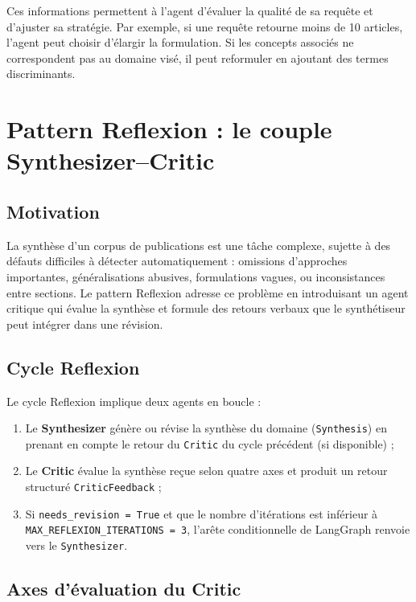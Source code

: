 Ces informations permettent à l'agent d'évaluer la qualité de sa requête
et d'ajuster sa stratégie. Par exemple, si une requête retourne moins de
10 articles, l'agent peut choisir d'élargir la formulation. Si les concepts
associés ne correspondent pas au domaine visé, il peut reformuler en
ajoutant des termes discriminants.

\section{Pattern Reflexion : le couple Synthesizer--Critic}
\label{sec:reflexion}

\subsection{Motivation}

La synthèse d'un corpus de publications est une tâche complexe, sujette
à des défauts difficiles à détecter automatiquement : omissions d'approches
importantes, généralisations abusives, formulations vagues, ou inconsistances
entre sections. Le pattern Reflexion \cite{shinn2023reflexion} adresse ce
problème en introduisant un agent critique qui évalue la synthèse et
formule des retours verbaux que le synthétiseur peut intégrer dans une
révision.

\subsection{Cycle Reflexion}

Le cycle Reflexion implique deux agents en boucle :

\begin{enumerate}
  \item Le \textbf{Synthesizer} génère ou révise la synthèse du domaine
    (\texttt{Synthesis}) en prenant en compte le retour du \texttt{Critic}
    du cycle précédent (si disponible) ;
  \item Le \textbf{Critic} évalue la synthèse reçue selon quatre axes
    et produit un retour structuré \texttt{CriticFeedback} ;
  \item Si \texttt{needs\_revision = True} et que le nombre d'itérations
    est inférieur à \texttt{MAX\_REFLEXION\_ITERATIONS = 3}, l'arête
    conditionnelle de LangGraph renvoie vers le \texttt{Synthesizer}.
\end{enumerate}

\subsection{Axes d'évaluation du Critic}

